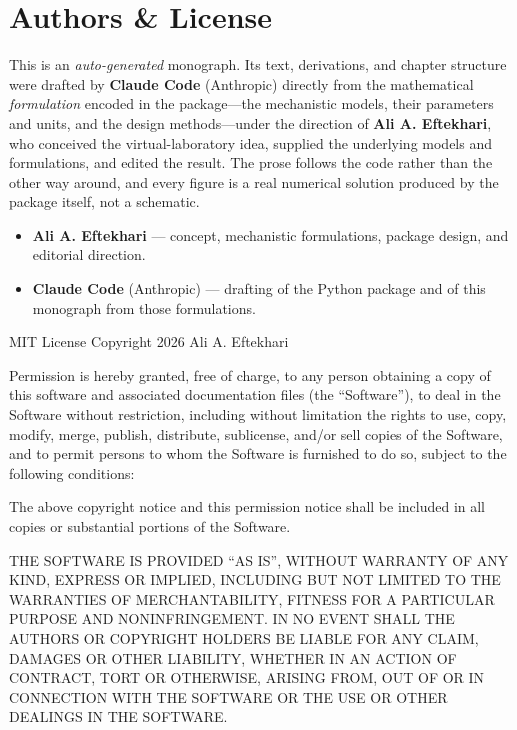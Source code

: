 \chapter*{Authors \& License}

This is an \emph{auto-generated} monograph. Its text, derivations, and chapter
structure were drafted by \textbf{Claude Code} (Anthropic) directly from the
mathematical \emph{formulation} encoded in the  package---the
mechanistic models, their parameters and units, and the design methods---under the
direction of \textbf{Ali A. Eftekhari}, who conceived the virtual-laboratory idea,
supplied the underlying models and formulations, and edited the result. The prose
follows the code rather than the other way around, and every figure is a real
numerical solution produced by the package itself, not a schematic.

\begin{itemize}
  \item \textbf{Ali A. Eftekhari} --- concept, mechanistic formulations, package
  design, and editorial direction.
  \item \textbf{Claude Code} (Anthropic) --- drafting of the 
  Python package and of this monograph from those formulations.
\end{itemize}

\begin{keybox}{MIT License}
\noindent Copyright \textcopyright{} 2026 Ali A. Eftekhari

\smallskip
\noindent Permission is hereby granted, free of charge, to any person obtaining a
copy of this software and associated documentation files (the ``Software''), to
deal in the Software without restriction, including without limitation the rights
to use, copy, modify, merge, publish, distribute, sublicense, and/or sell copies of
the Software, and to permit persons to whom the Software is furnished to do so,
subject to the following conditions:

\smallskip
\noindent The above copyright notice and this permission notice shall be included
in all copies or substantial portions of the Software.

\smallskip
\noindent THE SOFTWARE IS PROVIDED ``AS IS'', WITHOUT WARRANTY OF ANY KIND, EXPRESS
OR IMPLIED, INCLUDING BUT NOT LIMITED TO THE WARRANTIES OF MERCHANTABILITY, FITNESS
FOR A PARTICULAR PURPOSE AND NONINFRINGEMENT. IN NO EVENT SHALL THE AUTHORS OR
COPYRIGHT HOLDERS BE LIABLE FOR ANY CLAIM, DAMAGES OR OTHER LIABILITY, WHETHER IN AN
ACTION OF CONTRACT, TORT OR OTHERWISE, ARISING FROM, OUT OF OR IN CONNECTION WITH
THE SOFTWARE OR THE USE OR OTHER DEALINGS IN THE SOFTWARE.
\end{keybox}
